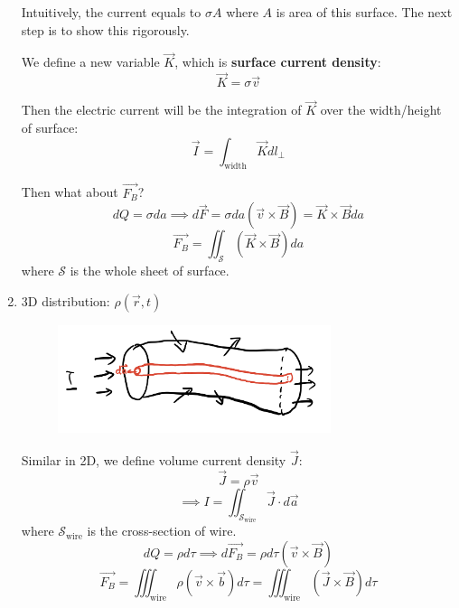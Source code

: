 \documentclass[12pt,a4paper,twoside]{article}
\begin{document}
\begin{enumerate}
        Intuitively, the current equals to $\sigma A$ where $A$ is area of this surface. The next step is to show this rigorously.
        
        We define a new variable $\overrightarrow{K}$, which is \textbf{surface current density}:
        \[\overrightarrow{K}=\sigma \overrightarrow{v}\]
        
        Then the electric current will be the integration of $\overrightarrow{K}$ over the width/height of surface:
        \begin{equation*}
            \boxed{\overrightarrow{I}=\int_{\mathrm{width}} \overrightarrow{K}dl_\perp}
        \end{equation*}
        
        Then what about $\overrightarrow{F_B}$?
        \[dQ=\sigma da\implies d\overrightarrow{F}=\sigma da(\overrightarrow{v}\times \overrightarrow{B})=\overrightarrow{K}\times \overrightarrow{B}da\]
        \begin{equation}
            \boxed{\overrightarrow{F_B} = \iint_{\mathcal{S}}(\overrightarrow{K}\times \overrightarrow{B})da}
        \end{equation}
        where $\mathcal{S}$ is the whole sheet of surface.
        
        \item 3D distribution: $\rho(\overrightarrow{r}, t)$
        \begin{figure}[ht]
            \centering
            \includegraphics[width=8cm]{250-Revision/current-3d.png}
        \end{figure}
        
        Similar in 2D, we define  volume current density $\overrightarrow{J}$:
        \[\overrightarrow{J}=\rho\overrightarrow{v}\]
        \[\implies \boxed{I=\iint_{\mathcal{S}_\mathrm{wire}}\overrightarrow{J}\cdot d\overrightarrow{a}}\]
        where $\mathcal{S_{\mathrm{wire}}}$ is the cross-section of wire.
        \[dQ=\rho d\tau\implies d\overrightarrow{F_B}=\rho d\tau(\overrightarrow{v}\times \overrightarrow{B})\]
        \begin{equation}
            \boxed{\overrightarrow{F_B}=\iiint_{\mathrm{wire}}\rho(\overrightarrow{v}\times \overrightarrow{b})d\tau=\iiint_{\mathrm{wire}}(\overrightarrow{J}\times \overrightarrow{B})d\tau}
        \end{equation}
    \end{enumerate}
    
\end{document}
